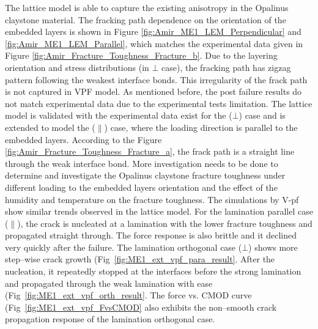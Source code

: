 The lattice model is able to capture the existing anisotropy in the Opalinus claystone material. The fracking path dependence on the orientation of the embedded layers is shown in Figure \ref{fig:Amir_ME1_LEM_Perpendicular} and \ref{fig:Amir_ME1_LEM_Parallel}, which matches the experimental data given in Figure \ref{fig:Amir_Fracture_Toughness_Fracture_b}. Due to the layering orientation and stress distributions (in $\bot$ case), the fracking path has zigzag pattern following the weakest interface bonds. This irregularity of the frack path is not captured in VPF model. As mentioned before, the post failure results do not match experimental data due to the experimental tests limitation. The lattice model is validated with the experimental data exist for the ($\bot$) case and is extended to model the ($\parallel$) case, where the loading direction is parallel to the embedded layers. According to the Figure \ref{fig:Amir_Fracture_Toughness_Fracture_a}, the frack path is a straight line through the weak interface bond. More investigation needs to be done to determine and investigate the Opalinus claystone fracture toughness under different loading to the embedded layers orientation and the effect of the humidity and temperature on the fracture toughness. 
The simulations by V-pf show similar trends observed in the lattice model.
For the lamination parallel case ($\parallel$), the crack is nucleated at a lamination with the lower fracture toughness and propagated straight through.
The force response is also brittle and it declined very quickly after the failure.
The lamination orthogonal case ($\bot$) shows more step--wise crack growth (Fig~\ref{fig:ME1_ext_vpf_para_result}. 
After the nucleation, it repeatedly stopped at the interfaces before the strong lamination and propagated through the weak lamination with ease (Fig~\ref{fig:ME1_ext_vpf_orth_result}.
The force vs. CMOD curve (Fig~\ref{fig:ME1_ext_vpf_FvsCMOD} also exhibits the non--smooth crack propagation response of the lamination orthogonal case. 

